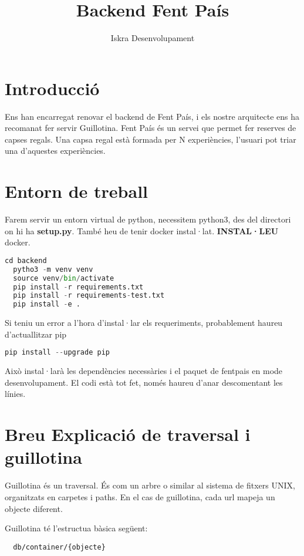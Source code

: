 \documentclass[a4paper, 11pt]{article}
\title{Backend Fent País}
\author{Iskra Desenvolupament}
\begin{document}
\maketitle
\tableofcontents

\section{Introducció}
Ens han encarregat renovar el backend de Fent País, i els nostre
arquitecte ens ha recomanat fer servir Guillotina. Fent País és un
servei que permet fer reserves de capses regals. Una capsa regal està
formada per N experiències, l'usuari pot triar una d'aquestes
experiències.

\section{Entorn de treball}
Farem servir un entorn virtual de python, necessitem python3, des del
directori on hi ha \textbf{setup.py}. També heu de tenir docker
instal·lat. \textbf{INSTAL·LEU} docker.

\begin{lstlisting}[language=Python, caption=Entorn virtual]
  cd backend
  pytho3 -m venv venv
  source venv/bin/activate
  pip install -r requirements.txt
  pip install -r requirements-test.txt
  pip install -e .
\end{lstlisting}
Si teniu un error a l'hora d'instal·lar els requeriments, probablement
haureu d'actuallitzar pip
\begin{lstlisting}[language=Python, caption=Entorn virtual]
  pip install --upgrade pip
\end{lstlisting}


Això instal·larà les dependències necessàries i el paquet de fentpais
en mode desenvolupament. El codi està tot fet, només haureu d'anar
descomentant les línies.

\section{Breu Explicació de traversal i guillotina}
Guillotina és un traversal. És com un arbre o similar al sistema de
fitxers UNIX, organitzats en carpetes i paths. En el cas de
guillotina, cada url mapeja un objecte diferent.

Guillotina té l'estructua bàsica següent:
\begin{lstlisting}
  db/container/{objecte}
\end{lstlisting}
\end{document}
